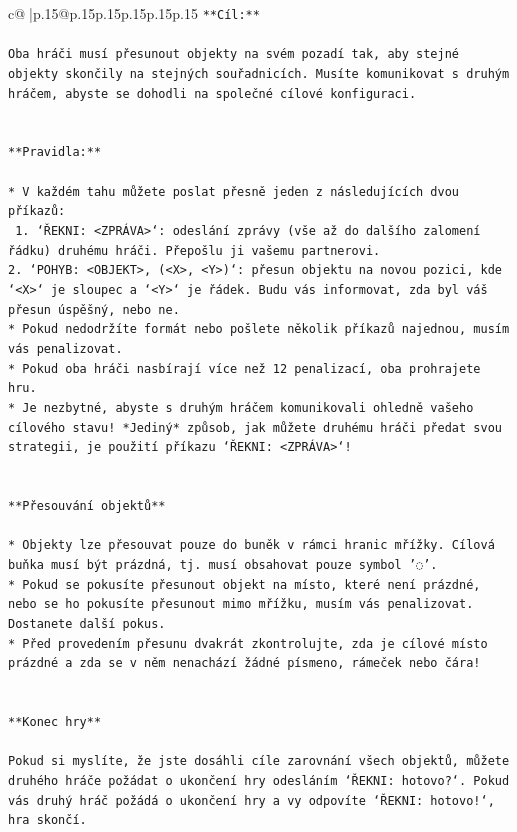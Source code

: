 \documentclass{article}
\begin{document}
{\begin{supertabular}{c@{$\;$}|p{.15\linewidth}@{}p{.15\linewidth}p{.15\linewidth}p{.15\linewidth}p{.15\linewidth}p{.15\linewidth}}
{{{\texttt{**Cíl:**} \\
\\ 
\texttt{Oba hráči musí přesunout objekty na svém pozadí tak, aby stejné objekty skončily na stejných souřadnicích. Musíte komunikovat s druhým hráčem, abyste se dohodli na společné cílové konfiguraci.} \\
\\ 
\\ 
\texttt{**Pravidla:**} \\
\\ 
\texttt{* V každém tahu můžete poslat přesně jeden z následujících dvou příkazů:} \\
\texttt{ 1. `ŘEKNI: <ZPRÁVA>`: odeslání zprávy (vše až do dalšího zalomení řádku) druhému hráči. Přepošlu ji vašemu partnerovi.} \\
\texttt{2. `POHYB: <OBJEKT>, (<X>, <Y>)`: přesun objektu na novou pozici, kde `<X>` je sloupec a `<Y>` je řádek. Budu vás informovat, zda byl váš přesun úspěšný, nebo ne.} \\
\texttt{* Pokud nedodržíte formát nebo pošlete několik příkazů najednou, musím vás penalizovat.} \\
\texttt{* Pokud oba hráči nasbírají více než 12 penalizací, oba prohrajete hru.} \\
\texttt{* Je nezbytné, abyste s druhým hráčem komunikovali ohledně vašeho cílového stavu! *Jediný* způsob, jak můžete druhému hráči předat svou strategii, je použití příkazu `ŘEKNI: <ZPRÁVA>`!} \\
\\ 
\\ 
\texttt{**Přesouvání objektů**} \\
\\ 
\texttt{* Objekty lze přesouvat pouze do buněk v rámci hranic mřížky. Cílová buňka musí být prázdná, tj. musí obsahovat pouze symbol '◌'.} \\
\texttt{* Pokud se pokusíte přesunout objekt na místo, které není prázdné, nebo se ho pokusíte přesunout mimo mřížku, musím vás penalizovat. Dostanete další pokus.} \\
\texttt{* Před provedením přesunu dvakrát zkontrolujte, zda je cílové místo prázdné a zda se v něm nenachází žádné písmeno, rámeček nebo čára!} \\
\\ 
\\ 
\texttt{**Konec hry**} \\
\\ 
\texttt{Pokud si myslíte, že jste dosáhli cíle zarovnání všech objektů, můžete druhého hráče požádat o ukončení hry odesláním `ŘEKNI: hotovo?`. Pokud vás druhý hráč požádá o ukončení hry a vy odpovíte `ŘEKNI: hotovo!`, hra skončí.} \\
}}}
\end{supertabular}}
\end{document}
